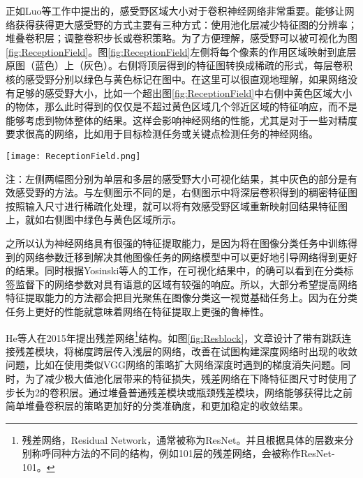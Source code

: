 正如Luo等工作\cite{luo2016understanding}中提出的，感受野区域大小对于卷积神经网络非常重要。能够让网络获得获得更大感受野的方式主要有三种方式：使用池化层减少特征图的分辨率；堆叠卷积层；调整卷积步长或卷积策略。为了方便理解，感受野可以被可视化为图\ref{fig:ReceptionField}。图\ref{fig:ReceptionField}左侧将每个像素的作用区域映射到底层原图（蓝色）上（灰色）。右侧将顶层得到的特征图转换成稀疏的形式，每层卷积核的感受野分别以绿色与黄色标记在图中。在这里可以很直观地理解，如果网络没有足够的感受野大小，比如一个超出图\ref{fig:ReceptionField}中右侧中黄色区域大小的物体，那么此时得到的仅仅是不超过黄色区域几个邻近区域的特征响应，而不是能够考虑到物体整体的结果。这样会影响神经网络的性能，尤其是对于一些对精度要求很高的网络，比如用于目标检测任务或关键点检测任务的神经网络。

\begin{figure*}[htbp]	
	\centering
	\texttt{[image: ReceptionField.png]}
	\caption{两种可视化感受野的方法\cite{fang2017reception}}
	\begin{minipage}{0.8\textwidth}
		\wuhao
		注：左侧两幅图分别为单层和多层的感受野大小可视化结果，其中灰色的部分是有效感受野的方法。与左侧图示不同的是，右侧图示中将深层卷积得到的稠密特征图按照输入尺寸进行稀疏化处理，就可以将有效感受野区域重新映射回结果特征图上，就如右侧图中绿色与黄色区域所示。
	\end{minipage}
	\label{fig:ReceptionField}
\end{figure*}

之所以认为神经网络具有很强的特征提取能力，是因为将在图像分类任务中训练得到的网络参数迁移到解决其他图像任务的网络模型中可以更好地引导网络得到更好的结果\cite{mishkin2015all}。同时根据Yosinski等人的工作\cite{yosinski2015understanding}，在可视化结果中，的确可以看到在分类标签监督下的网络参数对具有语意的区域有较强的响应。所以，大部分希望提高网络特征提取能力的方法都会把目光聚焦在图像分类这一视觉基础任务上。因为在分类任务上更好的性能就意味着网络在特征提取上更强的鲁棒性。

He等人在2015年提出残差网络\footnote{残差网络，Residual Network，通常被称为ResNet。并且根据具体的层数来分别称呼同种方法的不同的结构，例如101层的残差网络，会被称作ResNet-101。}结构\cite{He2015Deep}。如图\ref{fig:Resblock}，文章设计了带有跳跃连接残差模块，将梯度跨层传入浅层的网络，改善在试图构建深度网络时出现的收敛问题，比如在使用类似VGG网络\cite{simonyan2014very}的策略扩大网络深度时遇到的梯度消失问题。同时，为了减少极大值池化层带来的特征损失，残差网络在下降特征图尺寸时使用了步长为2的卷积层。通过堆叠普通残差模块或瓶颈残差模块，网络能够获得比之前简单堆叠卷积层的策略更加好的分类准确度，和更加稳定的收敛结果。

